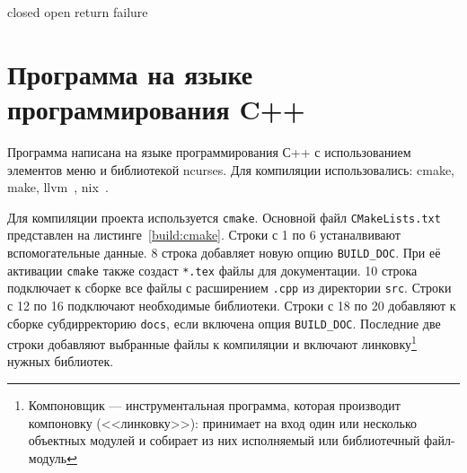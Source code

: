 \documentclass[chapterprefix=true,headings=onelineappendix]{scrartcl}
\begin{document}
\begin{algorithm}
	\caption{Псевдокод алгоритма A-star}
	\LinesNumbered{}


	\BlankLine

	closed \gets \set{} 
	open \gets {} 
	\;
	return failure\;
\end{algorithm}

\newpage{}
\section{Программа на языке программирования C++}

Программа написана на языке программирования С++ с использованием
элементов меню и библиотекой ncurses\cite{ПроектGNU1993-ncurses}. Для
компиляции использовались: cmake\cite{Kitware2000-cmake}, make,
llvm~\cite{LLVMFoundation2024}, nix~\cite{Долстра2003}.

Для компиляции проекта используется \verb|cmake|. Основной файл
\verb|CMakeLists.txt| представлен на листинге~\ref{build:cmake}. Строки с 1 по
6 устаналвивают вспомогательные данные. 8 строка добавляет новую опцию
\verb|BUILD_DOC|. При её активации \verb|cmake| также создаст \verb|*.tex|
файлы для документации. 10 строка подключает к сборке все файлы с расширением
\verb|.cpp| из директории \verb|src|. Строки с 12 по 16 подключают необходимые
библиотеки. Строки с 18 по 20 добавляют к сборке субдирректорию \verb|docs|,
если включена опция \verb|BUILD_DOC|. Последние две строки добавляют выбранные
файлы к компиляции и включают линковку\footnote{Компоновщик ---
  инструментальная программа, которая производит компоновку (<<линковку>>):
принимает на вход один или несколько объектных модулей и собирает из них
исполняемый или библиотечный файл-модуль} нужных библиотек.
\end{document}
